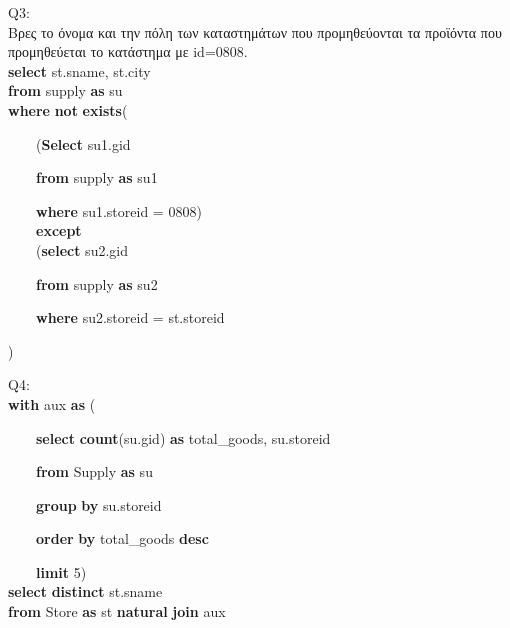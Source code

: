 \documentclass[a4paper]{article}
\begin{document}
\begin{minipage}{\linewidth}
Q3: \\

Βρες το όνομα και την πόλη των καταστημάτων που προμηθεύονται τα προϊόντα που προμηθεύεται το κατάστημα με id=0808. \\

\textbf{select} st.sname, st.city \\

\textbf{from} supply \textbf{as} su \\

\textbf{where} \textbf{not} \textbf{exists}( 

	~~~~(\textbf{Select} su1.gid 
	
	~~~~\textbf{from} supply \textbf{as} su1 
	
	~~~~\textbf{where} su1.storeid = 0808) \\
	

	~~~~\textbf{except} \\
	

	~~~~(\textbf{select} su2.gid 
	
	~~~~\textbf{from} supply \textbf{as} su2 
	
	~~~~\textbf{where} su2.storeid = st.storeid 
	
) \\

\end{minipage}

\begin{minipage}{\linewidth}
Q4: \\

\textbf{with} aux \textbf{as} (

    ~~~~\textbf{select} \textbf{count}(su.gid) \textbf{as} total\_goods, su.storeid
    
    ~~~~\textbf{from} Supply \textbf{as} su
    
    ~~~~\textbf{group} \textbf{by} su.storeid
    
    ~~~~\textbf{order} \textbf{by} total\_goods \textbf{desc}
    
    ~~~~\textbf{limit} 5) \\
    

\textbf{select} \textbf{distinct} st.sname\\

\textbf{from} Store \textbf{as} st
\textbf{natural} \textbf{join} aux\\

\end{minipage}
\end{document}
